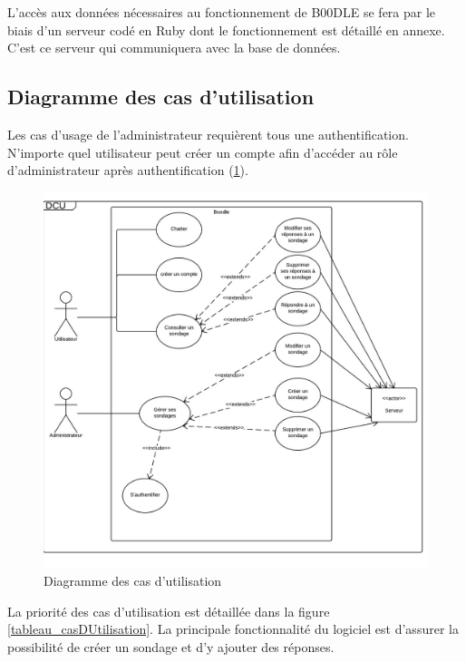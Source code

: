 \documentclass[titlepage]{report}
\begin{document}
L'accès aux données nécessaires au fonctionnement de B00DLE se fera par le biais d'un serveur codé en Ruby dont le fonctionnement est détaillé en annexe. C'est ce serveur qui communiquera avec la base de données.

\subsection{Diagramme des cas d'utilisation}

\par Les cas d'usage de l'administrateur requièrent tous une authentification. N'importe quel utilisateur peut créer un compte afin d'accéder au rôle d'administrateur après authentification (\ref{diagramme_casDUtilisation}).

\begin{figure}[h]
	\caption{Diagramme des cas d'utilisation}
	\label{diagramme_casDUtilisation}
	\centering
	\includegraphics[scale=0.8]{figures/diagrammes/casDUtilisation.png}
\end{figure}

\par La priorité des cas d'utilisation est détaillée dans la figure \ref{tableau_casDUtilisation}. La principale fonctionnalité du logiciel est d'assurer la possibilité de créer un sondage et d'y ajouter des réponses.
\end{document}
